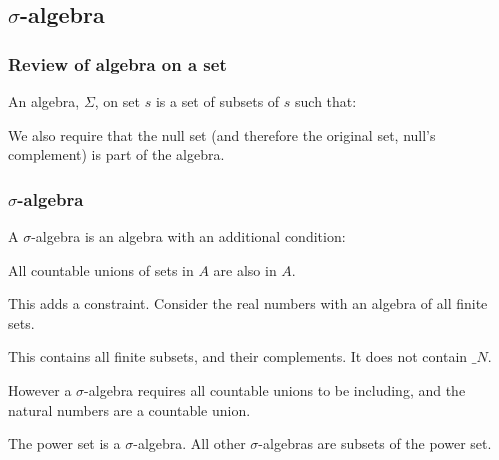 
\subsection{\(\sigma \)-algebra}

\subsubsection{Review of algebra on a set}

An algebra, \(\Sigma \), on set \(s\) is a set of subsets of \(s\) such that:


We also require that the null set (and therefore the original set, null's complement) is part of the algebra.

\subsubsection{\(\sigma \)-algebra}

A \(\sigma \)-algebra is an algebra with an additional condition:

All countable unions of sets in \(A\) are also in \(A\).

This adds a constraint. Consider the real numbers with an algebra of all finite sets.

This contains all finite subsets, and their complements. It does not contain \(\mathbb_{N}\).

However a \(\sigma \)-algebra requires all countable unions to be including, and the natural numbers are a countable union.

The power set is a \(\sigma \)-algebra. All other \(\sigma \)-algebras are subsets of the power set.

